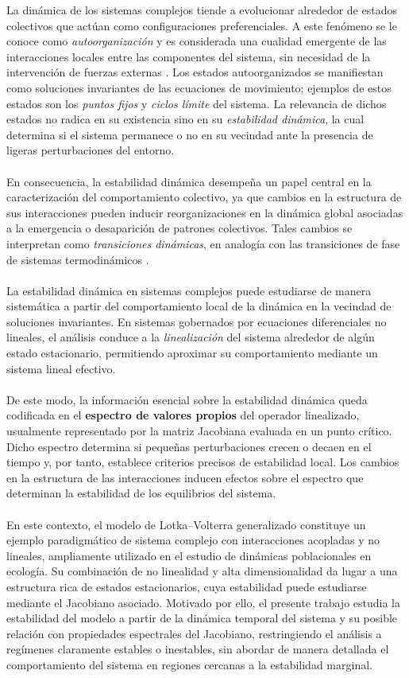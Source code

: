 \newpage
La dinámica de los sistemas complejos tiende a evolucionar alrededor de estados colectivos que actúan como configuraciones preferenciales. A este fenómeno se le conoce como \textit{autoorganización}  y es considerada una cualidad emergente de las interacciones locales entre las componentes del sistema, sin necesidad de la intervención de fuerzas externas \cite{miramontes2005sistemas}. Los estados autoorganizados se manifiestan como soluciones invariantes de las ecuaciones de movimiento; ejemplos de estos estados son los \textit{puntos fijos} y \textit{ciclos límite} del sistema. La relevancia de dichos estados no radica en su existencia sino en su \textit{estabilidad dinámica}, la cual determina si el sistema permanece o no en su vecindad ante la presencia de ligeras perturbaciones del entorno.\\
\\
En consecuencia, la estabilidad dinámica desempeña un papel central en la caracterización del comportamiento colectivo, ya que cambios en la estructura de sus interacciones pueden inducir reorganizaciones en la dinámica global asociadas a la emergencia o desaparición de patrones colectivos. Tales cambios se interpretan como \textit{transiciones dinámicas}, en analogía con las transiciones de fase de sistemas termodinámicos \cite{strogatz2001nonlinear}.
\\
\\
La estabilidad dinámica en sistemas complejos puede estudiarse de manera sistemática a partir del comportamiento local de la dinámica en la vecindad de soluciones invariantes. En sistemas gobernados por ecuaciones diferenciales no lineales, el análisis conduce a la \textit{linealización} del sistema alrededor de algún estado estacionario, permitiendo aproximar su comportamiento mediante un sistema lineal efectivo.\\
\\
De este modo, la información esencial sobre la estabilidad dinámica queda codificada en el \textbf{espectro de valores propios} del operador linealizado, usualmente representado por la matriz Jacobiana evaluada en un punto crítico. Dicho espectro determina si pequeñas perturbaciones crecen o decaen en el tiempo y, por tanto, establece criterios precisos de estabilidad local. Los cambios en la estructura de las interacciones inducen efectos sobre el espectro que determinan la estabilidad de los equilibrios del sistema. \\
\\
En este contexto, el modelo de Lotka–Volterra generalizado constituye un ejemplo paradigmático de sistema complejo con interacciones acopladas y no lineales, ampliamente utilizado en el estudio de dinámicas poblacionales en ecología. Su combinación de no linealidad y alta dimensionalidad da lugar a una estructura rica de estados estacionarios, cuya estabilidad puede estudiarse mediante el Jacobiano asociado. Motivado por ello, el presente trabajo estudia la estabilidad del modelo a partir de la dinámica temporal del sistema y su posible relación con propiedades espectrales del Jacobiano, restringiendo el análisis a regímenes claramente estables o inestables, sin abordar de manera detallada el comportamiento del sistema en regiones cercanas a la estabilidad marginal.


